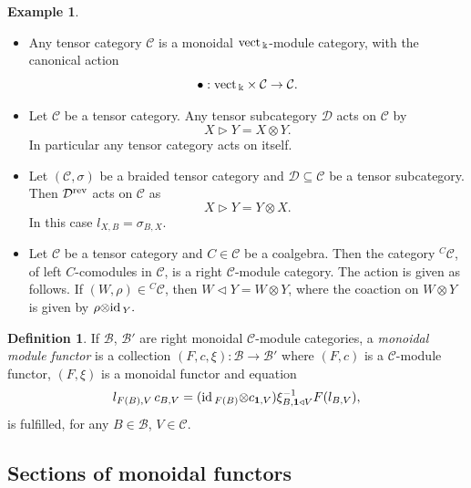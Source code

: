 \documentclass[11pt]{amsart}
\newcommand{\ca}{{\mathcal C}}
\newcommand{\ot}{{\otimes}}
\newcommand{\Do}{{\mathcal D}}
\newcommand{\vc}{{\mathcal C}}
\newcommand{\Bc}{{\mathcal B}}
\newcommand{\rev}{\rm{rev}}
\newcommand{\ku}{{\Bbbk}}
\newcommand{\uno}{ \mathbf{1}}
\newcommand{\id}{\mbox{\rm id\,}}
\newcommand{\vect}{\mbox{\rm vect\,}}
\renewcommand{\_}[1]{\mbox{$_{\left( #1 \right)}$}}
\theoremstyle{plain}
\numberwithin{equation}{section}
\theoremstyle{definition}
\newtheorem{defi}[teo]{Definition}
\newtheorem{exa}[teo]{Example}
\theoremstyle{remark}
\theoremstyle{introTheorems}
\begin{document}
\begin{exa}\begin{itemize}
\item[(i)]  Any tensor category $\vc$ is a monoidal $\vect_\ku$-module category, with the canonical action
\begin{equation*}
 \bullet: \vect_\ku \times \vc\to \vc.
\end{equation*}

\item[(ii)] Let $\vc$ be a tensor category. Any tensor subcategory $\Do$ acts on  $\vc$ by
$$X \triangleright Y=X\ot Y.$$
In particular any tensor category acts on itself.
\item[(iii)] Let $(\vc, \sigma)$ be a braided tensor category and $\Do\subseteq \vc$ be a tensor subcategory. Then $\Do^{\rev}$ acts on  $\vc$ as
$$X \triangleright Y=Y\ot X.$$
In this case $l_{X,B}=\sigma_{B,X}$.

\item[(iv)] Let $\vc$ be a tensor category and $C\in\vc$ be a coalgebra. Then the category ${}^C\vc$, of left $C$-comodules in $\vc$, is a right $\vc$-module category. The action is given as follows. If $(W,\rho)\in {}^C\vc$, then $W \triangleleft Y=W\ot Y$, where the coaction on $W\ot Y$ is given by $\rho\ot \id_Y.$

\end{itemize} 
\end{exa} 


\begin{defi} If $\Bc$, $\Bc'$ are right monoidal $\vc$-module categories,   a \textit{monoidal module functor} is a collection  $(F,c,\xi):\Bc\to \Bc'$ where $(F,c)$ is a $\ca$-module functor, $(F, \xi)$ is a monoidal functor and equation \begin{equation}\label{monoidal-mod-functor} l_{F(B),V}\, c_{B,V}= (\id_{F(B)}\ot c_{\uno, V}) \xi^{-1}_{B, \uno \triangleleft V} F(l_{B,V}),
\end{equation}
is fulfilled, for any $B\in \Bc$, $V\in \ca$.
\end{defi}





\subsection{Sections of monoidal functors}
\end{document}
